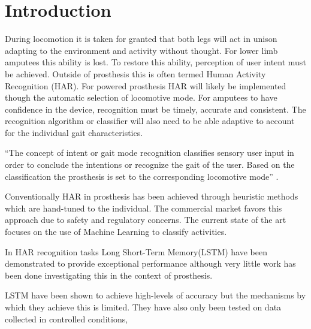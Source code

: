 \documentclass[sensors,article,submit,moreauthors,pdftex]{Definitions/mdpi}
\begin{document}

\section{Introduction} %
During locomotion it is taken for granted that both legs will act in unison adapting to the environment and activity without thought. For lower limb amputees this ability is lost. To restore this ability, perception of user intent must be achieved. Outside of prosthesis this is often termed Human Activity Recognition (HAR). For powered prosthesis HAR will likely be implemented though the automatic selection of locomotive mode\cite{Tucker2015, Windrich2016, Zhang2015}. For amputees to have confidence in the device, recognition must be timely, accurate and consistent\cite{Pedroli2019, Sinha2011}. The recognition algorithm or classifier will also need to be able adaptive to account for the individual gait characteristics\cite{Ponce2016}.

``The concept of intent or gait mode recognition classifies sensory user input in order to conclude the intentions or recognize the gait of the user. Based on the classification the prosthesis is set to the corresponding locomotive mode'' \cite{Windrich2016}. 

Conventionally HAR in prosthesis has been achieved through heuristic methods which are hand-tuned to the individual\cite{Maqbool2017, Xu2018}. The commercial market favors this approach due to safety and regulatory concerns\cite{Fluit2020}. The current state of the art focuses on the use of Machine Learning to classify activities\cite{Labarriere2020}.

In HAR recognition tasks Long Short-Term Memory(LSTM) have been demonstrated to provide exceptional performance\cite{Murad2017} although very little work has been done investigating this in the context of prosthesis\cite{Fluit2020}.

LSTM have been shown to achieve high-levels of accuracy but the mechanisms by which they achieve this is limited. They have also only been tested on data collected in controlled conditions,
\end{document}
